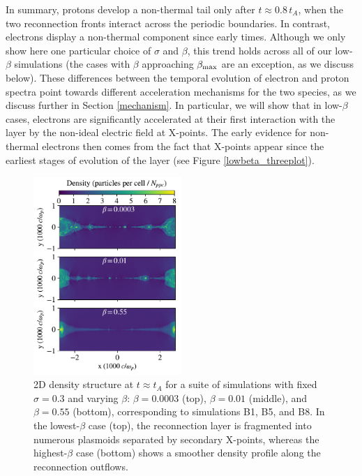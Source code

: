 In summary, protons develop a non-thermal tail only after $t\approx0.8\,t_A$, when the two reconnection fronts interact across the periodic boundaries. In contrast, electrons display a non-thermal component since early times. Although we only show here one particular choice of $\sigma$ and $\beta$, this trend holds across all of our low-$\beta$ simulations (the cases with $\beta$ approaching $\beta_{\rm max}$ are an exception, as we discuss below). These differences between the temporal evolution of electron and proton spectra point towards different acceleration mechanisms for the two species, as we discuss further in Section \ref{mechanism}. In particular, we will show that in low-$\beta$ cases, electrons are significantly accelerated at their first interaction with the layer by the non-ideal electric field at X-points. The early evidence for non-thermal electrons then comes from the fact that X-points appear since the earliest stages of evolution of the layer (see Figure \ref{lowbeta_threeplot}).

\begin{figure}[!h]
	\centering
	\includegraphics[width =0.5\textwidth]{sig_3_threeplot.pdf}
	\caption{2D density structure  at $t\approx t_{A}$ for a suite of simulations with fixed $\sigma=0.3$ and varying $\beta$: $\beta=0.0003$ (top), $\beta=0.01$ (middle), and $\beta=0.55$ (bottom), corresponding to simulations B1, B5, and B8.  In the lowest-$\beta$ case (top), the reconnection layer is fragmented into numerous plasmoids separated by secondary X-points, whereas the highest-$\beta$ case (bottom) shows a smoother density profile along the reconnection outflows.}
    \label{sig_3_twoplot}
\end{figure}

